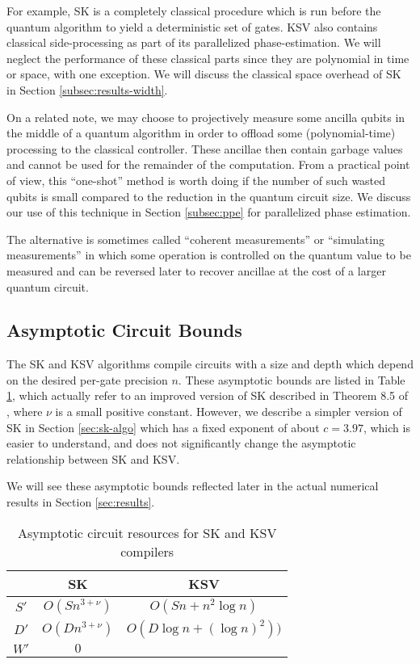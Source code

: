 For example,
SK is a completely classical procedure which is run before
the quantum algorithm to yield a deterministic set of gates. KSV
also contains classical side-processing as part of its parallelized
phase-estimation. We will neglect the performance of these classical parts
since they are polynomial in time or space, with one exception. We will
discuss the classical space overhead of SK in Section \ref{subsec:results-width}.

On a related note, we may choose to projectively measure some ancilla qubits
in the middle of a quantum algorithm in order to offload some (polynomial-time)
processing to the classical controller.
These ancillae then contain garbage values and
cannot be used for the remainder of the computation. From a practical point of
view, this ``one-shot'' method is worth doing if the number of such
wasted qubits is small compared to the reduction in the quantum circuit size.
We discuss our use of this technique in Section \ref{subsec:ppe} for parallelized
phase estimation.

The alternative is sometimes
called ``coherent measurements'' or ``simulating measurements'' \cite{Cleve2000}
in which some operation is controlled on the quantum value to be measured and
can be reversed later to recover ancillae at the cost of a larger quantum circuit.

\subsection{Asymptotic Circuit Bounds}

The SK and KSV algorithms compile circuits with
a size and depth which depend on the desired per-gate precision $n$.
These asymptotic bounds are listed in
Table \ref{tab:asymptotics}, which actually refer to an improved version of
SK described in Theorem 8.5 of \cite{ksv02}, where 
$\nu$ is a small positive constant.
However, we describe a simpler version of SK in Section \ref{sec:sk-algo}
which has a fixed exponent of about $c=3.97$, which is easier to understand,
and does not significantly change the asymptotic relationship between SK and
KSV.

We will see these asymptotic bounds reflected
later in the actual numerical results in Section \ref{sec:results}.

\begin{center}
\begin{table}
\label{tab:asymptotics}
\begin{tabular}{|c|c|c|}
\hline
   & SK & KSV \\
\hline
$S'$ & $O(Sn^{3+\nu})$ & $O(Sn + n^2 \log n)$\\
$D'$ & $O(Dn^{3+\nu})$ & $O(D \log{n} + (\log{n})^2))$\\ 
$W'$ & $0$             & $$ \\
\hline
\end{tabular}
\caption{Asymptotic circuit resources for SK and KSV compilers}
\end{table}
\end{center}